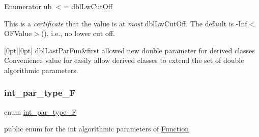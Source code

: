\begin{DoxyEnumFields}{Enumerator}
ub $<$= dbl\+Lw\+Cut\+Off

This is a {\itshape certificate} that the value is at {\itshape most} dbl\+Lw\+Cut\+Off. The default is -\/\+Inf$<$\+O\+F\+Value$>$(), i.\+e., no lower cut off. \\
\hline

[0pt][0pt]{}\mbox{\label{class_s_m_spp__di__unipi__it_1_1_function_ad7177cbeb2113eb7a975acec14d13027a81691cd64ff74036e01cfe20a1d2b85e}} 
dbl\+Last\+Par\+Fun&first allowed new double parameter for derived classes Convenience value for easily allow derived classes to extend the set of double algorithmic parameters. \\
\hline

\end{DoxyEnumFields}
\mbox{\label{class_s_m_spp__di__unipi__it_1_1_function_a6e928ff7188d46bdb66f31cda302ab06}} 
\subsubsection{\texorpdfstring{int\+\_\+par\+\_\+type\+\_\+F}{int\_par\_type\_F}}
{\footnotesize\ttfamily enum \mbox{\hyperlink{class_s_m_spp__di__unipi__it_1_1_function_a6e928ff7188d46bdb66f31cda302ab06}{int\+\_\+par\+\_\+type\+\_\+F}}}



public enum for the int algorithmic parameters of \mbox{\hyperlink{class_s_m_spp__di__unipi__it_1_1_function}{Function}} 

